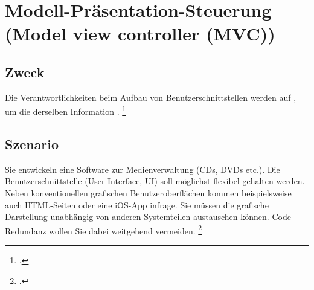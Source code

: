 \documentclass{lehramt-informatik-haupt}
\begin{document}

\chapter{Modell-Präsentation-Steuerung (Model view controller (MVC))}

\begin{liQuellen}
\item \cite{wiki:mvc}
\item \cite[Kapitel „Observer“, Seite 256]{gof}
\item \cite[Kapitel 5.6, Seite 92-95]{eilebrecht}
\item \cite[Kapitel 3.8, Seite 48-49]{siebler}
\end{liQuellen}

%

\liEntwurfsModellPraesentationSteuerungUml

\section{Zweck}

Die Verantwortlichkeiten beim Aufbau von Benutzerschnittstellen werden
auf , um die
 derselben Information .
\footcite[Seite 92]{eilebrecht}

%

\section{Szenario}

Sie entwickeln eine Software zur Medienverwaltung (CDs, DVDs etc.). Die
Benutzerschnittstelle (User Interface, UI) soll möglichst flexibel
gehalten werden. Neben konventionellen grafischen Benutzeroberflächen
kommen beispielsweise auch HTML-Seiten oder eine iOS-App infrage. Sie
müssen die grafische Darstellung unabhängig von anderen Systemteilen
austauschen können. Code-Redundanz wollen Sie dabei weitgehend
vermeiden.
\footcite[Seite 92]{eilebrecht}

\literatur
\end{document}
